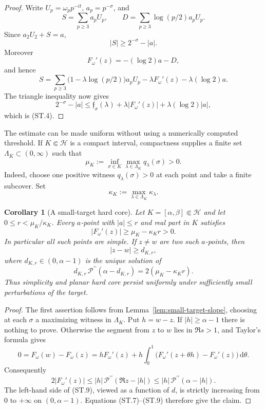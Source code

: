 \documentclass[11pt]{article}
\newtheorem{corollary}[theorem]{Corollary}
\theoremstyle{definition}
\theoremstyle{remark}
\newcommand{\cP}{\mathcal P}
\newcommand{\dd}{\,\mathrm d}
\begin{document}
\begin{proof}
Write $U_p=\omega_pp^{-it}$, $a_p=p^{-\sigma}$, and
\[
 S=\sum_{p\ge3}a_pU_p,
 \qquad
 D=\sum_{p\ge3}\log(p/2)a_pU_p.
\]
Since $a_2U_2+S=a$,
\[
 |S|\ge 2^{-\sigma}-|a|.
\]
Moreover
\[
 F_\omega'(z)=-(\log2)a-D,
\]
and hence
\[
 S
 =\sum_{p\ge3}\bigl(1-\lambda\log(p/2)\bigr)a_pU_p
   -\lambda F_\omega'(z)-\lambda(\log2)a.
\]
The triangle inequality now gives
\[
 2^{-\sigma}-|a|
 \le \mathfrak f_\sigma(\lambda)+\lambda|F_\omega'(z)|
       +\lambda(\log2)|a|,
\]
which is (ST.4).
\end{proof}

The estimate can be made uniform without using a numerically computed threshold.
If $K\Subset\mathcal H$ is a compact interval, compactness supplies a finite set
$\Lambda_K\subset(0,\infty)$ such that
\[
 \mu_K:=\inf_{\sigma\in K}\max_{\lambda\in\Lambda_K}q_\lambda(\sigma)>0.
 \tag{ST.5}
\]
Indeed, choose one positive witness $q_\lambda(\sigma)>0$ at each point and take a
finite subcover.  Set
\[
 \kappa_K:=\max_{\lambda\in\Lambda_K}\kappa_\lambda.
 \tag{ST.6}
\]

\begin{corollary}[A small-target hard core]
\label{cor:small-target-hard-core}
Let $K=[\alpha,\beta]\Subset\mathcal H$ and let $0\le r<\mu_K/\kappa_K$.
Every $a$-point with $|a|\le r$ and real part in $K$ satisfies
\[
 |F_\omega'(z)|\ge \mu_K-\kappa_Kr>0.
 \tag{ST.7}
\]
In particular all such points are simple.  If $z\ne w$ are two such $a$-points,
then
\[
 |z-w|\ge d_{K,r},
 \tag{ST.8}
\]
where $d_{K,r}\in(0,\alpha-1)$ is the unique solution of
\[
 d_{K,r}\,\cP^{\prime\prime}(\alpha-d_{K,r})
 =2(\mu_K-\kappa_Kr).
 \tag{ST.9}
\]
Thus simplicity and planar hard core persist uniformly under sufficiently small
perturbations of the target.
\end{corollary}

\begin{proof}
The first assertion follows from Lemma~\ref{lem:small-target-slope}, choosing at each
$\sigma$ a maximizing witness in $\Lambda_K$.  Put $h=w-z$.  If
$|h|\ge\alpha-1$ there is nothing to prove.  Otherwise the segment from $z$ to $w$
lies in $\Re s>1$, and Taylor's formula gives
\[
 0=F_\omega(w)-F_\omega(z)
  =hF_\omega'(z)
   +h\int_0^1\bigl(F_\omega'(z+\theta h)-F_\omega'(z)\bigr)\dd\theta.
\]
Consequently
\[
 2|F_\omega'(z)|
 \le |h|\,\cP^{\prime\prime}(\Re z-|h|)
 \le |h|\,\cP^{\prime\prime}(\alpha-|h|).
\]
The left-hand side of (ST.9), viewed as a function of $d$, is strictly
increasing from $0$ to $+\infty$ on $(0,\alpha-1)$.  Equations (ST.7)--(ST.9)
therefore give the claim.
\end{proof}
\end{document}
